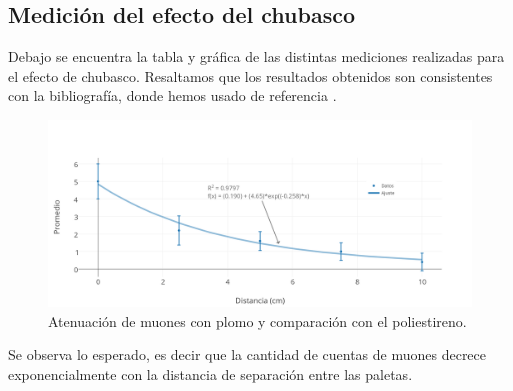 \documentclass[a4paper,10pt]{article}
\numberwithin{equation}{section}
\begin{document}
\subsection{Medición del efecto del chubasco}

Debajo se encuentra la tabla y gráfica de las distintas mediciones realizadas para 
el efecto de chubasco. Resaltamos que los resultados obtenidos son consistentes 
con la bibliografía, donde hemos usado de referencia \cite{tavera}.

\begin{table}[H]
\centering
\caption{Medición con plomo.}
\end{table}

\begin{figure}[H]
 \center 
 \includegraphics[scale=0.75]{chubascoPlot}
 \caption{Atenuación de muones con plomo y comparación con el poliestireno.}
 \label{fig:chubascoPlot}
\end{figure}

Se observa lo esperado, es decir que la cantidad de cuentas de muones decrece exponencialmente 
con la distancia de separación entre las paletas. 

\newpage
\end{document}
